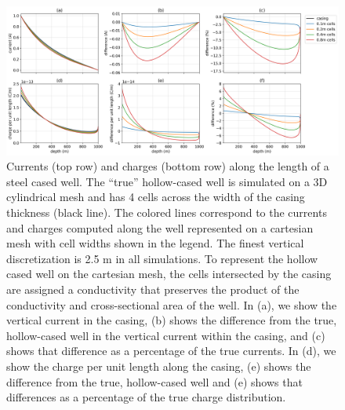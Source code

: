 \begin{figure}
    \begin{center}
    \includegraphics[width=\textwidth]{figures/approximating_wells_cartesian.png}
    \end{center}
\caption{
    Currents (top row) and charges (bottom row) along the length of
    a steel cased well. The ``true'' hollow-cased well is simulated on a
    3D cylindrical mesh and has 4 cells across the width of the casing thickness (black line).
    The colored lines correspond to the currents and charges computed along the
    well represented on a cartesian mesh with cell widths shown in the legend.
    The finest vertical discretization is 2.5 m in all simulations. To represent the
    hollow cased well on the cartesian mesh, the cells intersected by the casing are assigned
    a conductivity that preserves the product of the conductivity and cross-sectional area of the well.
    In (a), we show the vertical current in the casing,
    (b) shows the difference from the true, hollow-cased well
    in the vertical current within the casing, and (c) shows that difference as a percentage
    of the true currents. In (d), we show the charge per unit length along the casing, (e)
    shows the difference from the true, hollow-cased well and (e) shows that differences as
    a percentage of the true charge distribution.
}
\label{fig:approximating_wells_cartesian}
\end{figure}
